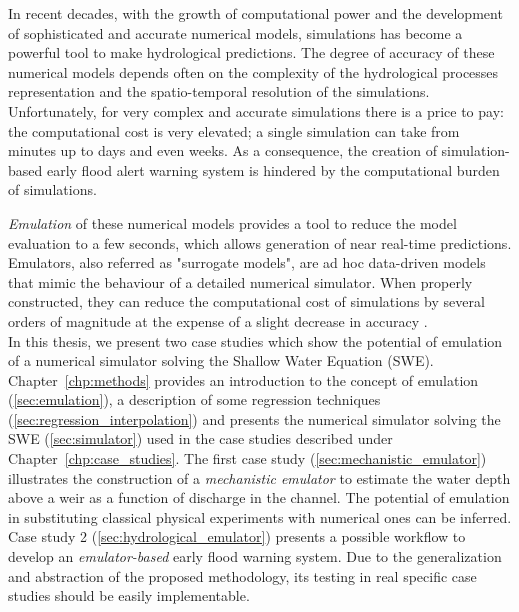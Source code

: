 In recent decades, with the growth of computational power and the development of sophisticated and accurate numerical models, simulations has become a powerful tool to make hydrological predictions. 
The degree of accuracy of these numerical models depends often on the complexity of the hydrological processes representation and the spatio-temporal resolution of the simulations. Unfortunately, for very complex and accurate simulations there is a price to pay: the computational cost is very elevated; a single simulation can take from  minutes up to days and even weeks. As a consequence, the creation of simulation-based early flood alert warning system is hindered by the computational burden of simulations. 

\emph{Emulation} of these numerical models provides a tool to reduce the model evaluation to a few seconds, which allows generation of near real-time predictions.
Emulators, also referred as "surrogate models", are ad hoc data-driven models that mimic the behaviour of a detailed numerical simulator. When properly constructed, they can reduce the computational cost of simulations by several orders of magnitude at the expense of a slight decrease in accuracy \autocite{carbajal_appraisal_2016}.\\

In this thesis, we present two case studies which show the potential of emulation of a numerical simulator solving the Shallow Water Equation (SWE). 
Chapter~\ref{chp:methods} provides an introduction to the concept of emulation (\ref{sec:emulation}), a description of some regression techniques (\ref{sec:regression_interpolation}) and presents the numerical simulator solving the SWE (\ref{sec:simulator}) used in the case studies described under Chapter~\ref{chp:case_studies}.
The first case study (\ref{sec:mechanistic_emulator}) illustrates the construction of a \emph{mechanistic emulator} to estimate the water depth above a weir as a function of discharge in the channel.
The potential of emulation in substituting classical physical experiments with numerical ones can be inferred.
Case study 2 (\ref{sec:hydrological_emulator}) presents a possible workflow to develop an \emph{emulator-based} early flood warning system. 
Due to the generalization and abstraction of the proposed methodology, its testing in real specific case studies should be easily implementable.\\



